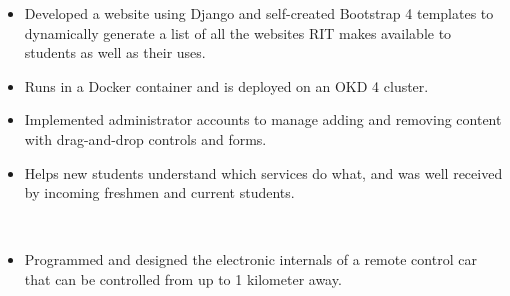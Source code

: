 \documentclass[11pt,letterpaper,ragged2e]{altacv}
\begin{document}
\vspace{6pt} %

{
\begin{itemize}
    \item Developed a website using Django and self-created Bootstrap 4 templates to dynamically generate a list of all the websites RIT makes available to students as well as their uses.
    \item Runs in a Docker container and is deployed on an OKD 4 cluster.
    \item Implemented administrator accounts to manage adding and removing content with drag-and-drop controls and forms.
    \item Helps new students understand which services do what, and was well received by incoming freshmen and current students.
\end{itemize}
}
{} \
\medskip


{
\begin{itemize}
    \item Programmed and designed the electronic internals of a remote control car that can be controlled from up to 1 kilometer away.
\end{itemize}
}
{} \

{} \

\clearpage

\nocite{*}
\end{document}
